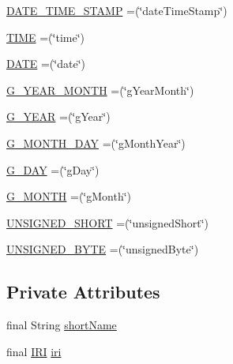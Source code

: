 \begin{DoxyCompactItemize}
\item 
\hyperlink{enumorg_1_1semanticweb_1_1owlapi_1_1vocab_1_1_x_s_d_vocabulary_a9f62a44a73b23a90763879f9abe627a4}{D\-A\-T\-E\-\_\-\-T\-I\-M\-E\-\_\-\-S\-T\-A\-M\-P} =(\char`\"{}date\-Time\-Stamp\char`\"{})
\item 
\hyperlink{enumorg_1_1semanticweb_1_1owlapi_1_1vocab_1_1_x_s_d_vocabulary_ae101676de2e81698e60d232819f32845}{T\-I\-M\-E} =(\char`\"{}time\char`\"{})
\item 
\hyperlink{enumorg_1_1semanticweb_1_1owlapi_1_1vocab_1_1_x_s_d_vocabulary_a057a84f63a7850d135abf5b0bcdcb904}{D\-A\-T\-E} =(\char`\"{}date\char`\"{})
\item 
\hyperlink{enumorg_1_1semanticweb_1_1owlapi_1_1vocab_1_1_x_s_d_vocabulary_a0e0687af22a7acd51cd21866ca1aa524}{G\-\_\-\-Y\-E\-A\-R\-\_\-\-M\-O\-N\-T\-H} =(\char`\"{}g\-Year\-Month\char`\"{})
\item 
\hyperlink{enumorg_1_1semanticweb_1_1owlapi_1_1vocab_1_1_x_s_d_vocabulary_ac86e9bcf26f455d43ca980f6dc47189e}{G\-\_\-\-Y\-E\-A\-R} =(\char`\"{}g\-Year\char`\"{})
\item 
\hyperlink{enumorg_1_1semanticweb_1_1owlapi_1_1vocab_1_1_x_s_d_vocabulary_a540fe8ccfc08400b2c7abd0f93c0eea9}{G\-\_\-\-M\-O\-N\-T\-H\-\_\-\-D\-A\-Y} =(\char`\"{}g\-Month\-Year\char`\"{})
\item 
\hyperlink{enumorg_1_1semanticweb_1_1owlapi_1_1vocab_1_1_x_s_d_vocabulary_a084a587eba03f707f8ff3c2b1a910765}{G\-\_\-\-D\-A\-Y} =(\char`\"{}g\-Day\char`\"{})
\item 
\hyperlink{enumorg_1_1semanticweb_1_1owlapi_1_1vocab_1_1_x_s_d_vocabulary_a394fba85ccafeafd97369e12042d5cb9}{G\-\_\-\-M\-O\-N\-T\-H} =(\char`\"{}g\-Month\char`\"{})
\item 
\hyperlink{enumorg_1_1semanticweb_1_1owlapi_1_1vocab_1_1_x_s_d_vocabulary_ad91f31bb3cef710354db46511d0db8d5}{U\-N\-S\-I\-G\-N\-E\-D\-\_\-\-S\-H\-O\-R\-T} =(\char`\"{}unsigned\-Short\char`\"{})
\item 
\hyperlink{enumorg_1_1semanticweb_1_1owlapi_1_1vocab_1_1_x_s_d_vocabulary_acae2feba3d5635102e5e1ccc48282a97}{U\-N\-S\-I\-G\-N\-E\-D\-\_\-\-B\-Y\-T\-E} =(\char`\"{}unsigned\-Byte\char`\"{})
\end{DoxyCompactItemize}
\subsection*{Private Attributes}
\begin{DoxyCompactItemize}
\item 
final String \hyperlink{enumorg_1_1semanticweb_1_1owlapi_1_1vocab_1_1_x_s_d_vocabulary_aa2e1cc090627fc2af048f0c203c94d19}{short\-Name}
\item 
final \hyperlink{classorg_1_1semanticweb_1_1owlapi_1_1model_1_1_i_r_i}{I\-R\-I} \hyperlink{enumorg_1_1semanticweb_1_1owlapi_1_1vocab_1_1_x_s_d_vocabulary_a2bcfa5c37288ba373631b9826e0f0424}{iri}
\end{DoxyCompactItemize}


